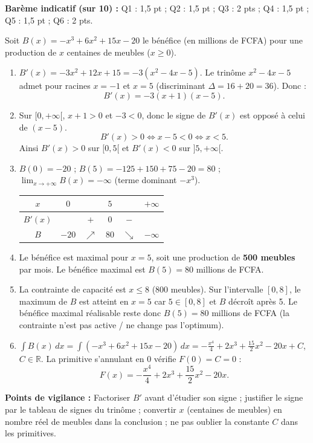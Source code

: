 \documentclass[11pt]{article}
\begin{document}
\begin{corrige}
\textbf{Barème indicatif (sur 10) :} Q1 : 1,5 pt ; Q2 : 1,5 pt ; Q3 : 2 pts ; Q4 : 1,5 pt ; Q5 : 1,5 pt ; Q6 : 2 pts.

Soit $B(x)=-x^3+6x^2+15x-20$ le bénéfice (en millions de FCFA) pour une production de $x$ centaines de meubles ($x\ge 0$).
\begin{enumerate}
    \item $B'(x)=-3x^2+12x+15=-3(x^2-4x-5)$. Le trinôme $x^2-4x-5$ admet pour racines $x=-1$ et $x=5$ (discriminant $\Delta=16+20=36$). Donc :
    \[ B'(x)=-3(x+1)(x-5). \]
    \item Sur $[0,+\infty[$, $x+1>0$ et $-3<0$, donc le signe de $B'(x)$ est opposé à celui de $(x-5)$.
    \[ B'(x)>0 \iff x-5<0 \iff x<5. \]
    Ainsi $B'(x)>0$ sur $[0,5[$ et $B'(x)<0$ sur $]5,+\infty[$.
    \item $B(0)=-20$ ; $B(5)=-125+150+75-20=80$ ; $\lim_{x\to+\infty}B(x)=-\infty$ (terme dominant $-x^3$).
    \begin{center}
    \begin{tabular}{|c|ccccc|}\hline
    $x$ & $0$ & & $5$ & & $+\infty$ \\ \hline
    $B'(x)$ & & $+$ & $0$ & $-$ & \\ \hline
    $B$ & $-20$ & $\nearrow$ & $80$ & $\searrow$ & $-\infty$ \\ \hline
    \end{tabular}
    \end{center}
    \item Le bénéfice est maximal pour $x=5$, soit une production de \textbf{500 meubles} par mois. Le bénéfice maximal est $B(5)=80$ millions de FCFA.
    \item La contrainte de capacité est $x\leq 8$ (800 meubles). Sur l'intervalle $[0,8]$, le maximum de $B$ est atteint en $x=5$ car $5\in[0,8]$ et $B$ décroît après 5. Le bénéfice maximal réalisable reste donc $B(5)=80$ millions de FCFA (la contrainte n'est pas active / ne change pas l'optimum).
    \item $\displaystyle\int B(x)\,dx=\int(-x^3+6x^2+15x-20)\,dx=-\frac{x^4}{4}+2x^3+\frac{15}{2}x^2-20x+C$, $C\in\mathbb{R}$.
    La primitive s'annulant en $0$ vérifie $F(0)=C=0$ :
    \[ F(x)=-\frac{x^4}{4}+2x^3+\frac{15}{2}x^2-20x. \]
\end{enumerate}

\textbf{Points de vigilance :} Factoriser $B'$ avant d'étudier son signe ; justifier le signe par le tableau de signes du trinôme ; convertir $x$ (centaines de meubles) en nombre réel de meubles dans la conclusion ; ne pas oublier la constante $C$ dans les primitives.
\end{corrige}
\end{document}
